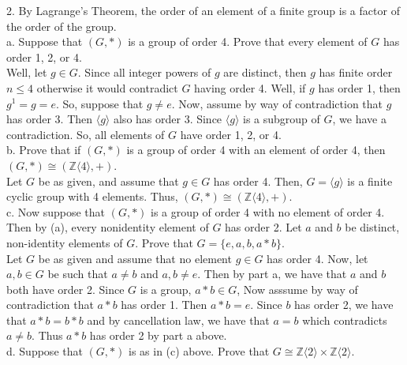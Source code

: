 \documentclass[12pt]{article}
\begin{document}
2. By Lagrange's Theorem, the order of an element of a finite group is a factor of the order of the group.\\
a. Suppose that $(G,*)$ is a group of order 4. Prove that every element of $G$ has order 1, 2, or 4.\\
Well, let $g\in G$. Since all integer powers of $g$ are distinct, then $g$ has finite order $n\leq4$ otherwise it would contradict $G$ having order 4. Well, if $g$ has order 1, then $g^1=g=e$. So, suppose that $g\neq e$. Now, assume by way of contradiction that $g$ has order 3. Then $\langle g\rangle$ also has order 3. Since $\langle g\rangle$ is a subgroup of $G$, we have a contradiction. So, all elements of $G$ have order 1, 2, or 4.\\
b. Prove that if $(G,*)$ is a group of order 4 with an element of order 4, then $(G,*)\cong(\mathbb{Z}\langle4\rangle,+)$.\\
Let $G$ be as given, and assume that $g\in G$ has order 4. Then, $G=\langle g\rangle$ is a finite cyclic group with 4 elements. Thus, $(G,*)\cong(\mathbb{Z}\langle4\rangle,+)$.\\
c. Now suppose that $(G,*)$ is a group of order 4 with no element of order 4. Then by (a), every nonidentity element of $G$ has order 2. Let $a$ and $b$ be distinct, non-identity elements of $G$. Prove that $G=\{e,a,b,a*b\}$.\\
Let $G$ be as given and assume that no element $g\in G$ has order 4. Now, let $a,b\in G$ be such that $a\neq b$ and $a,b\neq e$. Then by part a, we have that $a$ and $b$ both have order 2. Since $G$ is a group, $a*b\in G$, Now asssume by way of contradiction that $a*b$ has order 1. Then $a*b=e$. Since $b$ has order 2, we have that $a*b=b*b$ and by cancellation law, we have that $a=b$ which contradicts $a\neq b$. Thus $a*b$ has order 2 by part a above.\\
d. Suppose that $(G,*)$ is as in (c) above. Prove that $G\cong\mathbb{Z}\langle2\rangle\times\mathbb{Z}\langle2\rangle$.\\
\end{document}
